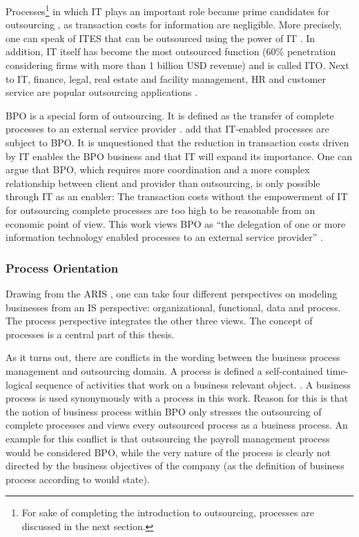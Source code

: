 		
		Processes\footnote{For sake of completing the introduction to outsourcing, processes are discussed in the next section. } in which IT plays an important role became prime candidates for outsourcing \citep[]{gross2006}, as transaction costs for information are negligible. More precisely, one can speak of \acrfull{ITES} that can be outsourced using the power of IT \citep[]{Ramachandran2004}. In addition, IT itself has become the most outsourced function (60\% penetration \citep{deloitte2014outsourcing} considering firms with more than 1 billion USD revenue) and is called \acrfull{ITO}. Next to IT, finance, legal, real estate and facility management, HR and customer service are popular outsourcing applications \citep{deloitte2014outsourcing}. 
		
		\acrshort{BPO} is a special form of outsourcing. It is defined as the transfer of complete processes to an external service provider \citep{wullenweber2008impact}. \cite{mani2010emp} add that IT-enabled processes are subject to BPO. It is unquestioned that the reduction in transaction costs driven by IT enables the BPO business and that IT will expand its importance. One can argue that BPO, which requires more coordination and a more complex relationship between client and provider than outsourcing, is only possible through IT as an enabler: The transaction costs without the empowerment of IT for outsourcing complete processes are too high to be reasonable from an economic point of view. This work views  BPO as \enquote{the delegation of one or more information technology enabled processes to an external service provider} \citep[]{mani2010emp}.
		
		\subsubsection{Process Orientation}
		\label{processorientation}
	Drawing from the  \acrfull{ARIS} \citep{Scheer1997}, one can take four different perspectives on modeling businesses from an \acrshort{IS} perspective: organizational, functional, data and process. The process perspective integrates the other three views. The concept of processes is a central part of this thesis. 

	As it turns out, there are conflicts in the wording between the business process management and outsourcing domain. A process is defined a self-contained time-logical sequence of activities that work on a business relevant object. \citep[]{becker2012pm}.
	A business process is used synonymously with a process in this work. Reason for this is that the notion of business process within BPO only stresses the outsourcing of complete processes and views every outsourced process as a business process.  An example for this conflict is that outsourcing the payroll management process would be considered \acrshort{BPO}, while the very nature of the process is clearly not directed by the business objectives of the company (as the definition of business process according to \citep[]{becker2012pm} would state). 
	
